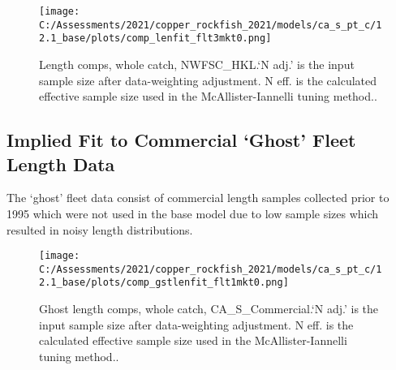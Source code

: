 \documentclass[11pt,
  english,
  a4paper,
]{article}
\begin{document}
\tagmcend\tagstructend


\begin{figure}
\centering
\texttt{[image: C:/Assessments/2021/copper\_rockfish\_2021/models/ca\_s\_pt\_c/12.1\_base/plots/comp\_lenfit\_flt3mkt0.png]}
\caption{Length comps, whole catch, NWFSC\_HKL.`N adj.' is the input sample size after data-weighting adjustment. N eff. is the calculated effective sample size used in the McAllister-Iannelli tuning method..\label{fig:comp_lenfit_flt3mkt0}}
\end{figure}

\tagmcend\tagstructend

\newpage


\hypertarget{implied-fit-to-commercial-ghost-fleet-length-data}{%
\subsection{Implied Fit to Commercial `Ghost' Fleet Length Data}\label{implied-fit-to-commercial-ghost-fleet-length-data}}

\leavevmode\tagmcend\tagstructend


The `ghost' fleet data consist of commercial length samples collected prior to 1995 which were not used in the base model due to low sample sizes which resulted in noisy length distributions.

\leavevmode\tagmcend\tagstructend\par


\begin{figure}
\centering
\texttt{[image: C:/Assessments/2021/copper\_rockfish\_2021/models/ca\_s\_pt\_c/12.1\_base/plots/comp\_gstlenfit\_flt1mkt0.png]}
\caption{Ghost length comps, whole catch, CA\_S\_Commercial.`N adj.' is the input sample size after data-weighting adjustment. N eff. is the calculated effective sample size used in the McAllister-Iannelli tuning method..\label{fig:comp_gstlenfit_flt1mkt0}}
\end{figure}

\tagmcend\tagstructend
\end{document}
